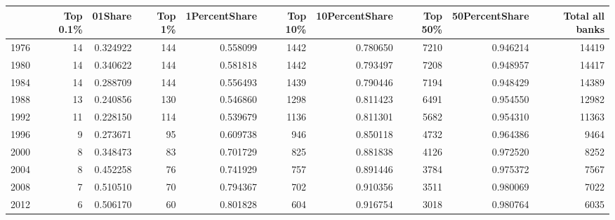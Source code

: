 \begin{tabular}{lrrrrrrrrr}
\toprule
{} &  Top 0.1\% &   01Share &  Top 1\% &  1PercentShare &  Top 10\% &  10PercentShare &  Top 50\% &  50PercentShare &  Total all banks \\
\midrule
1976 &        14 &  0.324922 &     144 &       0.558099 &     1442 &        0.780650 &     7210 &        0.946214 &            14419 \\
1980 &        14 &  0.340622 &     144 &       0.581818 &     1442 &        0.793497 &     7208 &        0.948957 &            14417 \\
1984 &        14 &  0.288709 &     144 &       0.556493 &     1439 &        0.790446 &     7194 &        0.948429 &            14389 \\
1988 &        13 &  0.240856 &     130 &       0.546860 &     1298 &        0.811423 &     6491 &        0.954550 &            12982 \\
1992 &        11 &  0.228150 &     114 &       0.539679 &     1136 &        0.811301 &     5682 &        0.954310 &            11363 \\
1996 &         9 &  0.273671 &      95 &       0.609738 &      946 &        0.850118 &     4732 &        0.964386 &             9464 \\
2000 &         8 &  0.348473 &      83 &       0.701729 &      825 &        0.881838 &     4126 &        0.972520 &             8252 \\
2004 &         8 &  0.452258 &      76 &       0.741929 &      757 &        0.891446 &     3784 &        0.975372 &             7567 \\
2008 &         7 &  0.510510 &      70 &       0.794367 &      702 &        0.910356 &     3511 &        0.980069 &             7022 \\
2012 &         6 &  0.506170 &      60 &       0.801828 &      604 &        0.916754 &     3018 &        0.980764 &             6035 \\
\bottomrule
\end{tabular}
